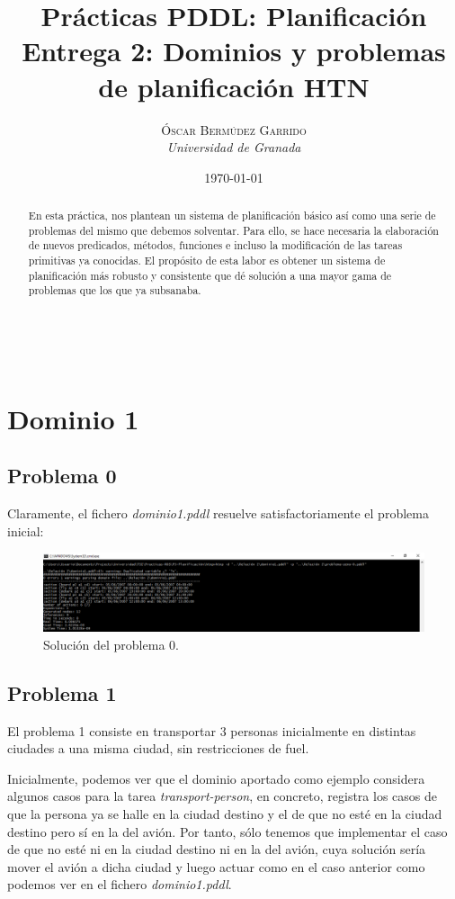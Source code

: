 \documentclass[a4paper, 11pt]{article}
\title{\textbf{Prácticas PDDL: Planificación}\\ %
Entrega 2: Dominios y problemas de planificación HTN} %
\author{\textsc{Óscar Bermúdez Garrido} %
\\{\textit{Universidad de Granada}}} %
\date{\today} %
\makeatletter
\renewcommand{\maketitle}{
  \begin{flushright} %
  
  {\LARGE\@title} %
  
  \vspace{50pt} %
  
  {\large\@author} %
  \\\@date %
  \vspace{40pt} %
  \end{flushright}
}
\makeatother
\begin{document}
\maketitle %

\renewcommand{\abstractname}{Resumen} %
\begin{abstract}
	En esta práctica, nos plantean un sistema de planificación básico así como una serie de problemas
	del mismo que debemos solventar. Para ello, se hace necesaria la elaboración de nuevos predicados,
	métodos, funciones e incluso la modificación de las tareas primitivas ya conocidas. El propósito
	de esta labor es obtener un sistema de planificación más robusto y consistente que dé solución a
	una mayor gama de problemas que los que ya subsanaba.
\end{abstract}

{\parskip=2pt
  \tableofcontents
}
\pagebreak


\section{Dominio 1}
	\subsection{Problema 0}
		Claramente, el fichero \textit{dominio1.pddl} resuelve satisfactoriamente el problema inicial:
		\begin{figure}[H]
			\centering
			\includegraphics[width=15cm]{Ej1-Problema0.png}
			\caption{Solución del problema 0.}
			\label{Prob-0}
		\end{figure}
		
	
	\subsection{Problema 1}
		El problema 1 consiste en transportar 3 personas inicialmente en distintas ciudades a una misma ciudad,
		sin restricciones de fuel.
		
		Inicialmente, podemos ver que el dominio aportado como ejemplo considera algunos casos para la tarea
		\textit{transport-person}, en concreto, registra los casos de que la persona ya se halle en la ciudad
		destino y el de que no esté en la ciudad destino pero sí en la del avión. Por tanto, sólo tenemos
		que implementar el caso de que no esté ni en la ciudad destino ni en la del avión, cuya solución sería
		mover el avión a dicha ciudad y luego actuar como en el caso anterior como podemos ver en el fichero
		\textit{dominio1.pddl}.
		
\end{document}

